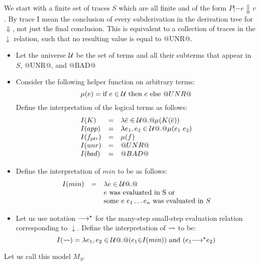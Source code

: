 \documentclass[preprint]{sigplanconf}
\begin{document}
\begin{definition}
We start with a finite set of traces $S$ which are all finite and of the form $P |- e \Downarrow v$.
By trace I mean the conclusion of every subderivation in the derivation tree 
for $\Downarrow$, not just the final conclusion. This is equivalent to a collection 
of traces in the $\downarrow$ relation, such that no resulting value is equal to @UNR@.
\begin{itemize}
  \item Let the universe ${\cal U}$ be the set of terms and all their subterms that appear in $S$, @UNR@, and @BAD@
  \item Consider the following helper function on arbitrary terms:
        \[ \mu(e) = \mbox{if } e \in {\cal U} \mbox{ then } e \mbox{ else } @UNR@ \] 
        Define the interpretation of the logical terms as follows:
        \[\begin{array}{lcl} 
            I(K)   & = & \lambda\overline{e} \in {\cal U} @.@ \mu(K(\overline{e})) \\
            I(app) & = & \lambda e_1,e_2 \in {\cal U} @.@ \mu(e_1\;e_2) \\
            I(f_{ptr}) & = & \mu(f) \\
            I(unr)  & = & @UNR@ \\
            I(bad)  & = & @BAD@ 
        \end{array}\]
  \item Define the interpretation of $min$ to be as follows:
        \[\begin{array}{lcl} 
           I(min) & = & \lambda e \in \Univ @.@ \\ 
                  &   & e \text{ was evaluated in } $S$ \text{ or } \\ 
                  &   & \text{some } e\;e_1\ldots e_n \text{ was evaluated in } S
        \end{array}\]
  \item Let us use notation $\longrightarrow^{\star}$ for the many-step small-step evaluation 
        relation corresponding to $\downarrow$.
        Define the interpretation of $\rightsquigarrow$ to be:
        \[ I(\rightsquigarrow) = \lambda e_1,e_2 \in {\cal U} @.@ (e_1{\in}I(min)) \mbox{ and } (e_1{\longrightarrow^{\star}}e_2) \]
\end{itemize} 
Let us call this model $M_S$.
\end{definition}
\end{document}
